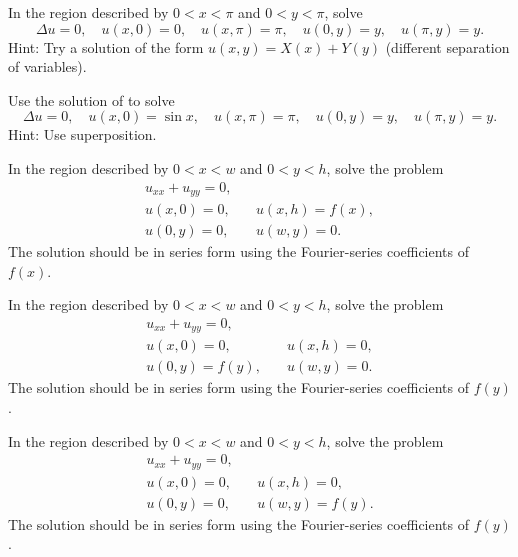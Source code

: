 \begin{exercise} \label{dirich:diffsepexr}
In the region described by $0 < x < \pi$ and $0 < y < \pi$,
solve
\begin{equation*}
\Delta u = 0,
\quad u(x,0) = 0,
\quad u(x,\pi) = \pi,
\quad u(0,y) = y,
\quad u(\pi,y) = y .
\end{equation*}
Hint: Try a solution of the form $u(x,y) = X(x) + Y(y)$ (different separation
of variables).
\end{exercise}

\begin{exercise}
Use the solution of  to solve
\begin{equation*}
\Delta u = 0,
\quad u(x,0) = \sin x,
\quad u(x,\pi) = \pi,
\quad u(0,y) = y,
\quad u(\pi,y) = y .
\end{equation*}
Hint: Use superposition.
\end{exercise}

\begin{exercise}
In the region described by $0 < x < w$ and $0 < y < h$,
solve the problem
\begin{equation*}
\begin{array}{ll}
u_{xx} + u_{yy} = 0, & \\
u(x,0) = 0, \quad & u(x,h) = f(x), \\
u(0,y) = 0, \quad & u(w,y) = 0.
\end{array}
\end{equation*}
The solution should be in series form using the Fourier-series coefficients
of $f(x)$.
\end{exercise}

\begin{exercise}
In the region described by $0 < x < w$ and $0 < y < h$,
solve the problem
\begin{equation*}
\begin{array}{ll}
u_{xx} + u_{yy} = 0, & \\
u(x,0) = 0, \quad & u(x,h) = 0, \\
u(0,y) = f(y), \quad & u(w,y) = 0.
\end{array}
\end{equation*}
The solution should be in series form using the Fourier-series coefficients
of $f(y)$.
\end{exercise}

\begin{exercise}
In the region described by $0 < x < w$ and $0 < y < h$,
solve the problem
\begin{equation*}
\begin{array}{ll}
u_{xx} + u_{yy} = 0, & \\
u(x,0) = 0, \quad & u(x,h) = 0, \\
u(0,y) = 0, \quad & u(w,y) = f(y).
\end{array}
\end{equation*}
The solution should be in series form using the Fourier-series coefficients
of $f(y)$.
\end{exercise}

